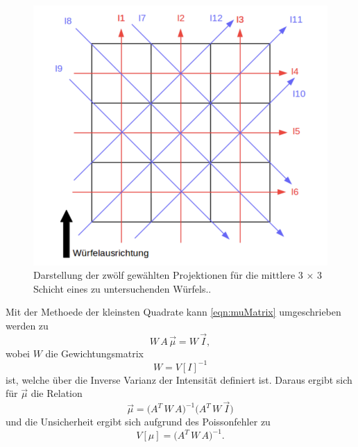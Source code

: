 \begin{figure}[H]
    \centering
    \includegraphics[scale=0.7]{Abbildungen/Ausrichtung.png}
    \caption{Darstellung der zwölf gewählten Projektionen für die mittlere 3 × 3 Schicht eines zu untersuchenden Würfels..\cite{V14}}
    \label{fig:Ausrichtung}
\end{figure}

Mit der Methoede der kleinsten Quadrate kann \autoref{eqn:muMatrix} umgeschrieben werden zu
\begin{equation}
    W \,A \,\vec{\mu} = W \,\vec{I},
\end{equation}
wobei $W$ die Gewichtungsmatrix
\begin{equation}
    W = V[I]^{-1}
\end{equation}
ist, welche über die Inverse Varianz der Intensität definiert ist. Daraus ergibt sich für $\vec{\mu}$ die Relation
\begin{equation}
    \vec{\mu} = \biggl(A^T\, W \,A\biggr)^{-1} \biggl(A^T \,W \,\vec{I}\biggr)
\end{equation}
und die Unsicherheit ergibt sich aufgrund des Poissonfehler zu
\begin{equation}
    V[\mu] = \biggl(A^T\, W \,A\biggr)^{-1}.
    \label{eqn:Unsicherheit}
\end{equation}




